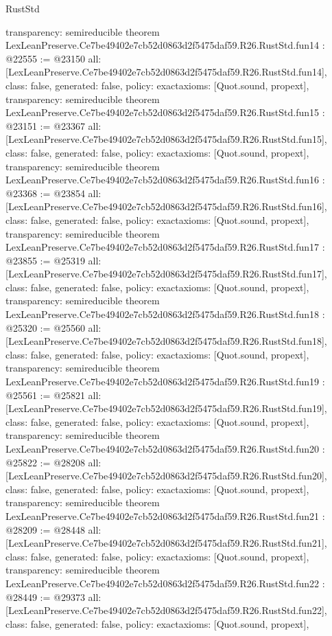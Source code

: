 \begin{lexlean}{RustStd}
\begin{coremodule}
{  transparency: semireducible
}
theorem LexLeanPreserve.Ce7be49402e7cb52d0863d2f5475daf59.R26.RustStd.fun14 : @22555 := @23150 {
  all: [LexLeanPreserve.Ce7be49402e7cb52d0863d2f5475daf59.R26.RustStd.fun14],
  class: false,
  generated: false,
  policy: exact{axioms: [Quot.sound, propext]},
  transparency: semireducible
}
theorem LexLeanPreserve.Ce7be49402e7cb52d0863d2f5475daf59.R26.RustStd.fun15 : @23151 := @23367 {
  all: [LexLeanPreserve.Ce7be49402e7cb52d0863d2f5475daf59.R26.RustStd.fun15],
  class: false,
  generated: false,
  policy: exact{axioms: [Quot.sound, propext]},
  transparency: semireducible
}
theorem LexLeanPreserve.Ce7be49402e7cb52d0863d2f5475daf59.R26.RustStd.fun16 : @23368 := @23854 {
  all: [LexLeanPreserve.Ce7be49402e7cb52d0863d2f5475daf59.R26.RustStd.fun16],
  class: false,
  generated: false,
  policy: exact{axioms: [Quot.sound, propext]},
  transparency: semireducible
}
theorem LexLeanPreserve.Ce7be49402e7cb52d0863d2f5475daf59.R26.RustStd.fun17 : @23855 := @25319 {
  all: [LexLeanPreserve.Ce7be49402e7cb52d0863d2f5475daf59.R26.RustStd.fun17],
  class: false,
  generated: false,
  policy: exact{axioms: [Quot.sound, propext]},
  transparency: semireducible
}
theorem LexLeanPreserve.Ce7be49402e7cb52d0863d2f5475daf59.R26.RustStd.fun18 : @25320 := @25560 {
  all: [LexLeanPreserve.Ce7be49402e7cb52d0863d2f5475daf59.R26.RustStd.fun18],
  class: false,
  generated: false,
  policy: exact{axioms: [Quot.sound, propext]},
  transparency: semireducible
}
theorem LexLeanPreserve.Ce7be49402e7cb52d0863d2f5475daf59.R26.RustStd.fun19 : @25561 := @25821 {
  all: [LexLeanPreserve.Ce7be49402e7cb52d0863d2f5475daf59.R26.RustStd.fun19],
  class: false,
  generated: false,
  policy: exact{axioms: [Quot.sound, propext]},
  transparency: semireducible
}
theorem LexLeanPreserve.Ce7be49402e7cb52d0863d2f5475daf59.R26.RustStd.fun20 : @25822 := @28208 {
  all: [LexLeanPreserve.Ce7be49402e7cb52d0863d2f5475daf59.R26.RustStd.fun20],
  class: false,
  generated: false,
  policy: exact{axioms: [Quot.sound, propext]},
  transparency: semireducible
}
theorem LexLeanPreserve.Ce7be49402e7cb52d0863d2f5475daf59.R26.RustStd.fun21 : @28209 := @28448 {
  all: [LexLeanPreserve.Ce7be49402e7cb52d0863d2f5475daf59.R26.RustStd.fun21],
  class: false,
  generated: false,
  policy: exact{axioms: [Quot.sound, propext]},
  transparency: semireducible
}
theorem LexLeanPreserve.Ce7be49402e7cb52d0863d2f5475daf59.R26.RustStd.fun22 : @28449 := @29373 {
  all: [LexLeanPreserve.Ce7be49402e7cb52d0863d2f5475daf59.R26.RustStd.fun22],
  class: false,
  generated: false,
  policy: exact{axioms: [Quot.sound, propext]},
}
\end{coremodule}
\end{lexlean}
